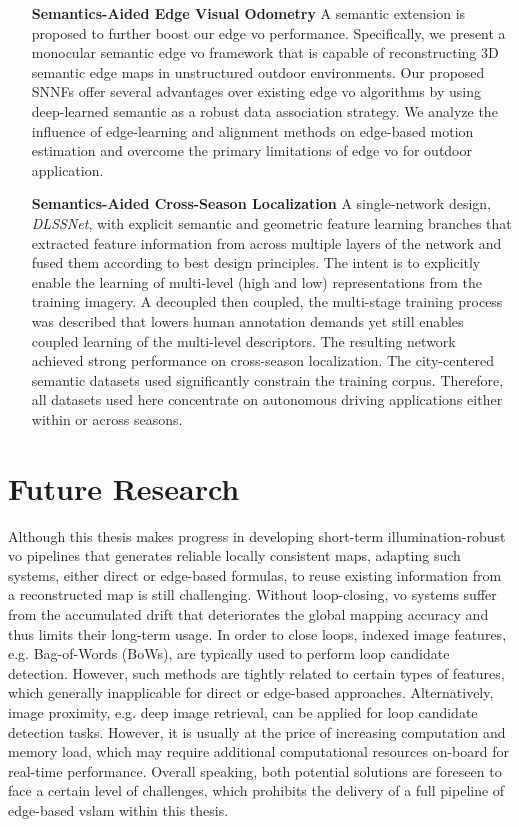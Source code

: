\begin{enumerate}
	\item[\textbf{Semantics-Aided Edge Visual Odometry}] A semantic extension is proposed to further boost our edge \acrshort{vo} performance. Specifically, we present a monocular semantic edge \acrshort{vo} framework that is capable of reconstructing 3D semantic edge maps in unstructured outdoor environments. Our proposed SNNFs offer several advantages over existing edge \acrshort{vo} algorithms by using deep-learned semantic as a robust data association strategy. We analyze the influence of edge-learning and alignment methods on edge-based motion estimation and overcome the primary limitations of edge \acrshort{vo} for outdoor application. 
	\item[\textbf{Semantics-Aided Cross-Season Localization}] A single-network design, {\em DLSSNet}, with explicit semantic and geometric feature learning branches that extracted feature information from across multiple layers of the network and fused them according to best design principles. The intent is to explicitly enable the learning of multi-level (high and low) representations from the training imagery. A decoupled then coupled, the multi-stage training process was described that lowers human annotation demands yet still enables coupled learning of the multi-level descriptors. The resulting network achieved strong performance on cross-season localization. The city-centered semantic datasets used significantly constrain the training corpus. Therefore, all datasets used here concentrate on autonomous driving applications either within or across seasons.
\end{enumerate}


\section{Future Research}
Although this thesis makes progress in developing short-term illumination-robust \acrshort{vo} pipelines that generates reliable locally consistent maps, adapting such systems, either direct or edge-based formulas, to reuse existing information from a reconstructed map is still challenging. 
Without loop-closing, \acrshort{vo} systems suffer from the accumulated drift that deteriorates the global mapping accuracy and thus limits their long-term usage. 
In order to close loops, indexed image features, e.g. Bag-of-Words (BoWs), are typically used to perform loop candidate detection. 
However, such methods are tightly related to certain types of features, which generally inapplicable for direct or edge-based approaches. 
Alternatively, image proximity, e.g. deep image retrieval, can be applied for loop candidate detection tasks.
However, it is usually at the price of increasing computation and memory load, which may require additional computational resources on-board for real-time performance.  
Overall speaking, both potential solutions are foreseen to face a certain level of challenges, which prohibits the delivery of a full pipeline of edge-based \acrshort{vslam} within this thesis. 

